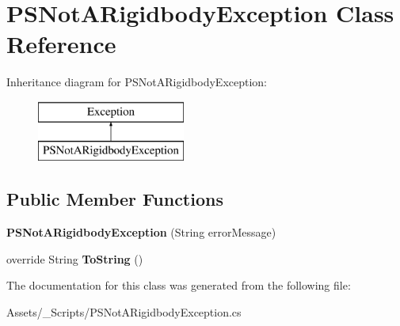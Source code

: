 \hypertarget{class_p_s_not_a_rigidbody_exception}{}\section{P\+S\+Not\+A\+Rigidbody\+Exception Class Reference}
\label{class_p_s_not_a_rigidbody_exception}
Inheritance diagram for P\+S\+Not\+A\+Rigidbody\+Exception\+:\begin{figure}[H]
\begin{center}
\leavevmode
\includegraphics[height=2.000000cm]{class_p_s_not_a_rigidbody_exception}
\end{center}
\end{figure}
\subsection*{Public Member Functions}
\begin{DoxyCompactItemize}
\item 
\mbox{\label{class_p_s_not_a_rigidbody_exception_ae580bfedec292de8d5d313cfe5205455}} 
{\bfseries P\+S\+Not\+A\+Rigidbody\+Exception} (String error\+Message)
\item 
\mbox{\label{class_p_s_not_a_rigidbody_exception_a227f5a538589f953e232db95357532b6}} 
override String {\bfseries To\+String} ()
\end{DoxyCompactItemize}


The documentation for this class was generated from the following file\+:\begin{DoxyCompactItemize}
\item 
Assets/\+\_\+\+Scripts/P\+S\+Not\+A\+Rigidbody\+Exception.\+cs\end{DoxyCompactItemize}
